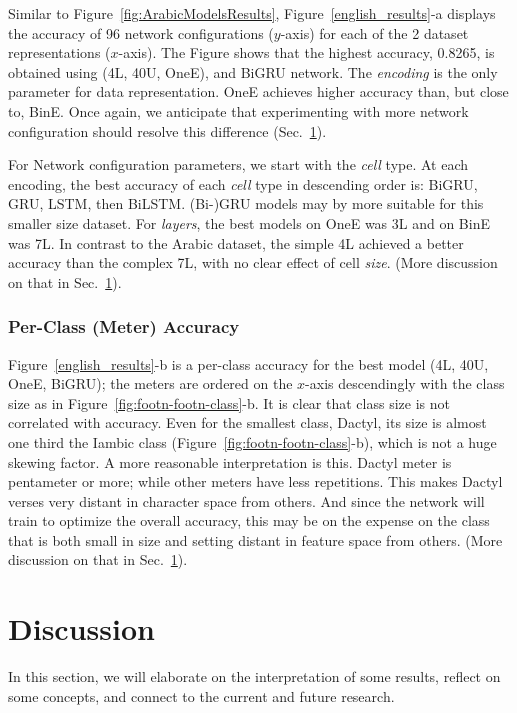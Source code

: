 \documentclass[journal,10pt,twocolumns,letter]{IEEEtran}
\begin{document}
Similar to Figure~\ref{fig:ArabicModelsResults}, Figure~\ref{english_results}-a displays the accuracy of 96 network configurations ($y$-axis) for each of the 2 dataset representations
($x$-axis). The Figure shows that the highest accuracy, 0.8265, is obtained using (4L, 40U,
OneE), and BiGRU network. The \textit{encoding} is the only parameter for data representation. OneE
achieves higher accuracy than, but close to, BinE. Once again, we anticipate that experimenting
with more network configuration should resolve this difference (Sec.~\ref{sec:discussion}).

For Network configuration parameters, we start with the \textit{cell} type. At each encoding, the
best accuracy of each \textit{cell} type in descending order is: BiGRU, GRU, LSTM, then
BiLSTM\@. (Bi-)GRU models may by more suitable for this smaller size dataset. For \textit{layers},
the best models on OneE was 3L and on BinE was 7L. In contrast to the Arabic dataset, the simple 4L
achieved a better accuracy than the complex 7L, with no clear effect of cell \textit{size}. (More
discussion on that in Sec.~\ref{sec:discussion}).

\bigskip

\subsubsection{Per-Class (Meter) Accuracy}\label{sec:per-class-meter}
Figure~\ref{english_results}-b is a per-class accuracy for the best model (4L, 40U, OneE, BiGRU);
the meters are ordered on the $x$-axis descendingly with the class size as in
Figure~\ref{fig:footn-footn-class}-b. It is clear that class size is not correlated with
accuracy. Even for the smallest class, Dactyl, its size is almost one third the Iambic class
(Figure~\ref{fig:footn-footn-class}-b), which is not a huge skewing factor. A more reasonable
interpretation is this. Dactyl meter is pentameter or more; while other meters have less
repetitions. This makes Dactyl verses very distant in character space from others. And since the
network will train to optimize the overall accuracy, this may be on the expense on the class that is
both small in size and setting distant in feature space from others. (More discussion on that in
Sec.~\ref{sec:discussion}).







\section{Discussion}\label{sec:discussion}
In this section, we will elaborate on the interpretation of some results, reflect on some concepts,
and connect to the current and future research.
\end{document}
